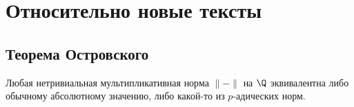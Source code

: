 \documentclass[
	extrafontsizes,
	11pt,
	hyphens,
]{memoir}
\begin{document}
%
%
%
%



\chapter{Относительно новые тексты}


\section{Теорема Островского}

\begin{theorem}
Любая нетривиальная мультипликативная норма \(\lVert - \rVert\) на \(\Q\) эквивалентна либо обычному абсолютному значению, либо какой-то из \(p\)-адических норм.
\end{theorem}
\end{document}
